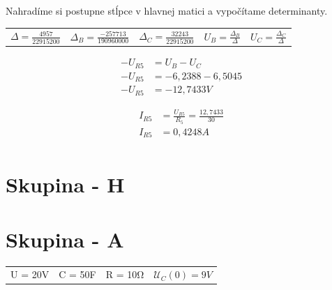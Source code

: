 \documentclass[12pt,a4paper]{article}
\begin{document}
 \vspace{0.3cm}
 Nahradíme si postupne stĺpce v hlavnej matici a vypočítame determinanty.
  \vspace{0.3cm}

  \begin{tabular}{ l l l l l }
  	$\Delta = \frac{4957}{22915200}$ & $\Delta_B = \frac{-257713}{190960000}$ & $\Delta_C = \frac{32243}{22915200}$ & $U_B = \frac{\Delta_B}{\Delta}$ & $U_C = \frac{\Delta_C}{\Delta}$ \\
  \end{tabular}
  
  \vspace{0.5cm}
  
    \begin{minipage}{\linewidth}
      \centering
      \begin{minipage}{0.45\linewidth}
           	\begin{align*}
       			-U_{R5} &= U_B - U_C \\
       			-U_{R5} &= -6,2388 - 6,5045  \\
       			-U_{R5} &= -12,7433 V 
		\end{align*}
      \end{minipage}
      \hspace{0.05\linewidth}
      \begin{minipage}{0.45\linewidth}
           	\begin{align*}
       			I_{R5} &= \frac{U_{R5}}{R_5} = \frac{12,7433}{30}  \\
       			I_{R5} &= 0,4248 A  \\
		\end{align*}
      \end{minipage}
  \end{minipage}
  
\newpage
\section{Skupina - H}
  
\newpage
\section{Skupina - A}
\begin{tabular}{ l l l l }
  U = 20V & C = 50F & R = 10\si{\ohm} & $\mathcal{U}_C(0) = 9V$  \\
\end{tabular}
\end{document}
